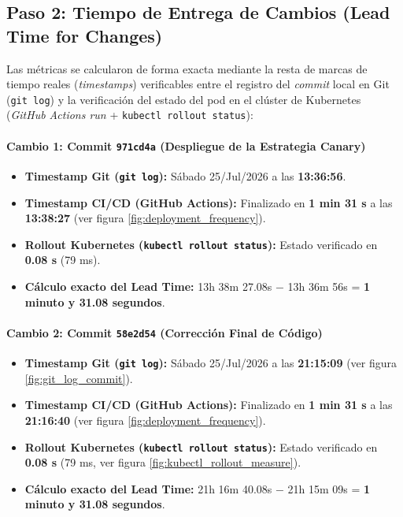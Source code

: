 \documentclass[11pt,a4paper]{article}
\begin{document}
\subsection{Paso 2: Tiempo de Entrega de Cambios (Lead Time for Changes)}
Las métricas se calcularon de forma exacta mediante la resta de marcas de tiempo reales (\textit{timestamps}) verificables entre el registro del \textit{commit} local en Git (\texttt{git log}) y la verificación del estado del pod en el clúster de Kubernetes (\textit{GitHub Actions run} + \texttt{kubectl rollout status}):

\paragraph*{Cambio 1: Commit \texttt{971cd4a} (Despliegue de la Estrategia Canary)}
\begin{itemize}[leftmargin=1.5em]
    \item \textbf{Timestamp Git (\texttt{git log}):} Sábado 25/Jul/2026 a las \textbf{13:36:56}.
    \item \textbf{Timestamp CI/CD (GitHub Actions):} Finalizado en \textbf{1 min 31 s} a las \textbf{13:38:27} (ver figura \ref{fig:deployment_frequency}).
    \item \textbf{Rollout Kubernetes (\texttt{kubectl rollout status}):} Estado verificado en \textbf{0.08 s} (79 ms).
    \item \textbf{Cálculo exacto del Lead Time:} 13h 38m 27.08s $-$ 13h 36m 56s = \textbf{1 minuto y 31.08 segundos}.
\end{itemize}

\paragraph*{Cambio 2: Commit \texttt{58e2d54} (Corrección Final de Código)}
\begin{itemize}[leftmargin=1.5em]
    \item \textbf{Timestamp Git (\texttt{git log}):} Sábado 25/Jul/2026 a las \textbf{21:15:09} (ver figura \ref{fig:git_log_commit}).
    \item \textbf{Timestamp CI/CD (GitHub Actions):} Finalizado en \textbf{1 min 31 s} a las \textbf{21:16:40} (ver figura \ref{fig:deployment_frequency}).
    \item \textbf{Rollout Kubernetes (\texttt{kubectl rollout status}):} Estado verificado en \textbf{0.08 s} (79 ms, ver figura \ref{fig:kubectl_rollout_measure}).
    \item \textbf{Cálculo exacto del Lead Time:} 21h 16m 40.08s $-$ 21h 15m 09s = \textbf{1 minuto y 31.08 segundos}.
\end{itemize}
\end{document}
